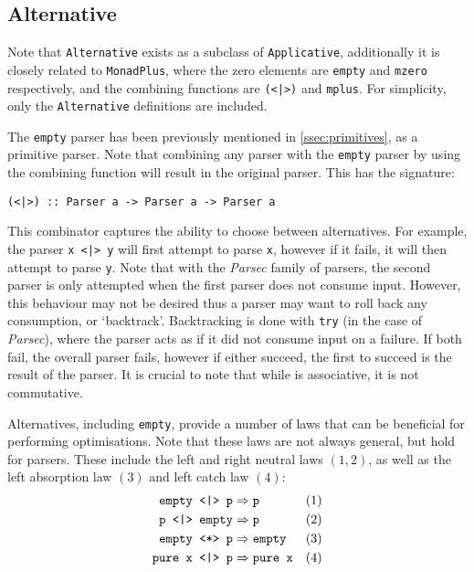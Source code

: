 \subsection{Alternative}
\label{ssec:alternative}
Note that \texttt{Alternative} exists as a subclass of \texttt{Applicative}, additionally it is closely related to \texttt{MonadPlus}, where the zero elements are \texttt{empty} and \texttt{mzero} respectively, and the combining functions are \texttt{(<|>)} and \texttt{mplus}.
For simplicity, only the \texttt{Alternative} definitions are included.

The \texttt{empty} parser has been previously mentioned in \autoref{ssec:primitives}, as a primitive parser.
Note that combining any parser with the \texttt{empty} parser by using the combining function will result in the original parser.
This has the signature:

\begin{verbatim}
(<|>) :: Parser a -> Parser a -> Parser a
\end{verbatim}

This combinator captures the ability to choose between alternatives.
For example, the parser \texttt{x <|> y} will first attempt to parse \texttt{x}, however if it fails, it will then attempt to parse \texttt{y}.
Note that with the \textit{Parsec} \cite{leijen01} family of parsers, the second parser is only attempted when the first parser does not consume input.
However, this behaviour may not be desired thus a parser may want to roll back any consumption, or `backtrack'.
Backtracking is done with \texttt{try} (in the case of \textit{Parsec}), where the parser acts as if it did not consume input on a failure.
If both fail, the overall parser fails, however if either succeed, the first to succeed is the result of the parser.
It is crucial to note that while \texttt{\choice} is associative, it is not commutative.

Alternatives, including \texttt{empty}, provide a number of laws that can be beneficial for performing optimisations.
Note that these laws are not always general, but hold for parsers.
These include the left and right neutral laws $(1, 2)$, as well as the left absorption law $(3)$ and left catch law $(4)$:
\begin{align*}
    \texttt{empty \choice p} & \Rightarrow \texttt{p} & (1) \\
    \texttt{p \choice empty} & \Rightarrow \texttt{p} & (2) \\
    \texttt{empty \ap p} & \Rightarrow \texttt{empty} & (3) \\
    \texttt{pure x \choice p} & \Rightarrow \texttt{pure x} & (4)
\end{align*}

